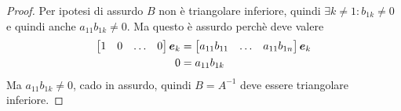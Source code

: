 \begin{proof}
Per ipotesi di assurdo $B$ non \`e triangolare inferiore, quindi $\exists k
\not = 1: b_{1k} \not = 0$ e quindi anche $a_{11}b_{1k} \not = 0$. Ma questo \`e
assurdo perch\`e deve valere 
\begin{displaymath}
\begin{split}
\begin{bmatrix}
1 & 0 & \ldots & 0
\end{bmatrix} \boldsymbol{e}_{k} &= 
\begin{bmatrix}
a_{11}b_{11} & \ldots & a_{11}b_{1n}
\end{bmatrix} \boldsymbol{e}_{k} \\
0 &= a_{11}b_{1k}
\end{split}
\end{displaymath}
Ma $a_{11}b_{1k} \not = 0$, cado in assurdo, quindi $B=A^{-1}$ deve essere
triangolare inferiore.
\end{proof}

